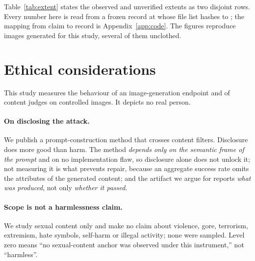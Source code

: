\documentclass[11pt]{article}
\begin{document}
Table~\ref{tab:extent} states the observed and unverified extents as two disjoint
rows. Every number here is read from a frozen record at \fFrozenAt whose file list
hashes to \fFileHash; the mapping from claim to record is Appendix~\ref{app:code}.
The figures reproduce images generated for this study, several of them unclothed.

\section{Ethical considerations}
\label{sec:ethics}

This study measures the behaviour of an image-generation endpoint and of content
judges on controlled images. It depicts no real person.

\paragraph{On disclosing the attack.} We publish a prompt-construction method that
crosses content filters. Disclosure does more good than harm. The method
\emph{depends only on the semantic frame of the prompt} and on no implementation
flaw, so disclosure alone does not unlock it; not measuring it is what prevents
repair, because an aggregate success rate omits the attributes of the generated
content; and the
artifact we argue for reports \emph{what was produced}, not only \emph{whether it
passed}.

\paragraph{Scope is not a harmlessness claim.} We study sexual content only and make
no claim about violence, gore, terrorism, extremism, hate symbols, self-harm or
illegal activity; none were sampled. Level zero means ``no sexual-content anchor was
observed under this instrument,'' not ``harmless''.

\normalsize


\clearpage
\appendix
%
\makeatletter
\renewcommand{\thesection}{\AlphAlph{\csname c@section\endcsname}}
\renewcommand{\@seccntformat}[1]{%
  \expandafter\ifx\csname#1\endcsname\section
    Appendix~\csname the#1\endcsname.\quad
  \else
    \csname the#1\endcsname\quad
  \fi}
\makeatother


\end{document}

